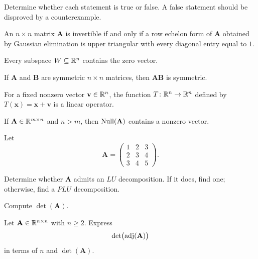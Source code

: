 \begin{problem}
Determine whether each statement is true or false. A false statement should be disproved by a counterexample.
\begin{problemchoices}
\item An $n\times n$ matrix $\mathbf A$ is invertible if and only if a row echelon form of $\mathbf A$ obtained by Gaussian elimination is upper triangular with every diagonal entry equal to $1$.
\item Every subspace $W\subseteq\mathbb{R}^n$ contains the zero vector.
\item If $\mathbf A$ and $\mathbf B$ are symmetric $n\times n$ matrices, then $\mathbf A\mathbf B$ is symmetric.
\item For a fixed nonzero vector $\mathbf v\in\mathbb{R}^n$, the function $T\colon\mathbb{R}^n\to\mathbb{R}^n$ defined by $T(\mathbf x)=\mathbf x+\mathbf v$ is a linear operator.
\item If $\mathbf A\in\mathbb{R}^{m\times n}$ and $n>m$, then $\operatorname{Null}(\mathbf A)$ contains a nonzero vector.
\end{problemchoices}
\end{problem}

\begin{problem}
Let
\[
\mathbf A=
\begin{pmatrix}
1&2&3\\
2&3&4\\
3&4&5
\end{pmatrix}.
\]
\begin{problemsubparts}
\item Determine whether $\mathbf A$ admits an $LU$ decomposition. If it does, find one; otherwise, find a $PLU$ decomposition.
\item Compute $\det(\mathbf A)$.
\end{problemsubparts}
\end{problem}

\begin{problem}
Let $\mathbf A\in\mathbb{R}^{n\times n}$ with $n\ge2$. Express
\[
\det\bigl(\operatorname{adj}(\mathbf A)\bigr)
\]
in terms of $n$ and $\det(\mathbf A)$.
\end{problem}


